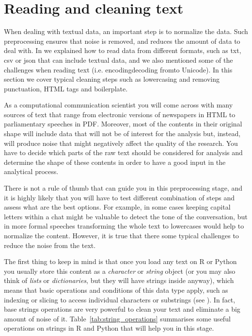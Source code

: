 \section{Reading and cleaning text}
\label{sec:readtext}

When dealing with textual data, an important step is to normalize the data. Such preprocessing ensures that noise is removed, and reduces the amount of data to deal with. In  we explained how to read data from different formats, such as txt, csv or json that can include textual data, and we also mentioned some of the challenges when reading text (i.e. encoding\/decoding from\/to Unicode). In this section we cover typical cleaning steps such as lowercasing and removing punctuation, HTML tags and boilerplate.
 
As a computational communication scientist you will come across with many sources of text that range from electronic versions of newspapers in HTML to parliamentary speeches in PDF. Moreover, most of the contents in their original shape will include data that will not be of interest for the analysis but, instead,  will produce noise that might negatively affect the quality of the research. You have to decide which parts of the raw text should be considered for analysis and determine the shape of these contents in order to have a good input in the analytical process. 

There is not a rule of thumb that can guide you in this preprocessing stage, and it is highly likely that you will have to test different combination of steps and assess what are the best options. For example, in some cases keeping capital letters within a chat might be valuable to detect the tone of the conversation, but in more formal speeches transforming the whole text to lowercases would help to normalize the content. However, it is true that there some typical challenges to reduce the noise from the text.

The first thing to keep in mind is that once you load any text on R or Python you usually store this content as a \emph{character} or \emph{string} object (or you may also think of \emph{lists} or \emph{dictionaries}, but they will have strings inside anyway), which means that basic operations and conditions of this data type apply, such as indexing or slicing to access individual characters or substrings (see ). In fact, base strings operations are very powerful to clean your text and eliminate a big amount of noise of it.  Table~\ref{tab:string_operations} summarises some useful operations on strings in R and Python that will help you in this stage.   

